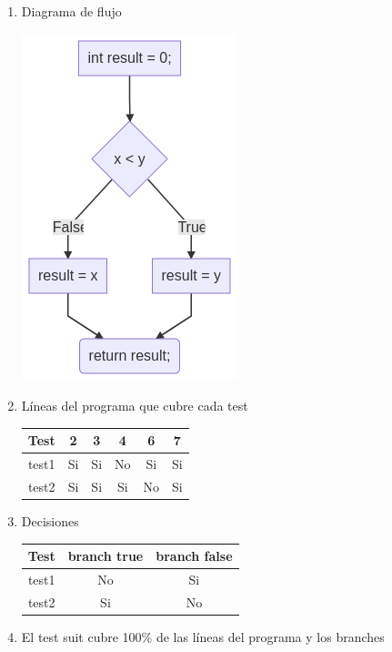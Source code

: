 \documentclass{article}
\begin{document}
\begin{enumerate}
    \item Diagrama de flujo

    \quad\includegraphics[scale=0.65]{./recursos/flow-chart.png}

    \item Líneas del programa que cubre cada test
    
    \begin{center}
        \begin{tabular}{ |c|c|c|c|c|c| } 
        \hline
        Test &  2   & 3     & 4     & 6     & 7     \\
        \hline
        test1 & Si  & Si    & No    & Si    & Si    \\
        test2 & Si  & Si    & Si    & No    & Si    \\
        \hline
        \end{tabular}
    \end{center}

    \item Decisiones

    \begin{center}
        \begin{tabular}{ |c|c|c| } 
        \hline
        Test  & branch true & branch false \\
        \hline
        test1 & No          & Si            \\
        test2 & Si          & No            \\
        \hline
        \end{tabular}
    \end{center}

    \item El test suit cubre 100\% de las líneas del programa y los branches

\end{enumerate}
\end{document}
